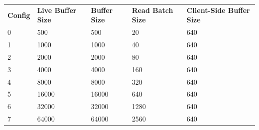 \begin{table}
\centering
\begin{tabular}{lllll}
\textbf{Config}                                      & \textbf{Live Buffer Size} & \textbf{Buffer Size} & \textbf{Read Batch Size} & \textbf{Client-Side Buffer Size}  \\
0 & 500                                                        & 500         & 20              & 640                       \\
1 & 1000             & 1000                                                  & 40                                                        & 640                                                                 \\
2                                           & 2000                                                       & 2000        & 80              & 640                                                                \\
3                                           & 4000                                                       & 4000                                                  & 160                                                       & 640                                                                \\
4                                           & 8000                                                       & 8000                                                  & 320                                                       & 640                                                                \\
5                                           & 16000                                                      & 16000                                                 & 640                                                       & 640                                                               \\
6                                           & 32000                                                      & 32000                                                 & 1280                                                      & 640                                                               \\
7                                           & 64000                                                      & 64000                                                 & 2560                                                      & 640                                                               \\

\end{tabular}
\end{table}
